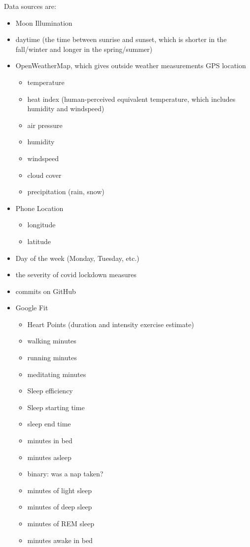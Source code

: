 \documentclass[conference]{IEEEtran}
\begin{document}
Data sources are:
\begin{itemize}
\item Moon Illumination
\item daytime (the time between sunrise and sunset, which is shorter in the fall/winter and longer in the spring/summer)
\item OpenWeatherMap, which gives outside weather measurements GPS location 
   \begin{itemize}
\item temperature
\item heat index (human-perceived equivalent temperature, which includes humidity and windspeed)
\item air pressure
\item humidity
\item windspeed
\item cloud cover
\item precipitation (rain, snow)
\end{itemize}
\item Phone Location
   \begin{itemize}
\item longitude
\item latitude
\end{itemize}
\item Day of the week (Monday, Tuesday, etc.)
\item the severity of covid lockdown measures
\item commits on GitHub
\item Google Fit
   \begin{itemize}
\item Heart Points (duration and intensity exercise estimate)
\item walking minutes
\item running minutes
\item meditating minutes
\item Sleep efficiency
\item Sleep starting time
\item sleep end time
\item minutes in bed
\item minutes asleep
\item binary: was a nap taken?
\item minutes of light sleep
\item minutes of deep sleep
\item minutes of REM sleep
\item minutes awake in bed

\end{itemize}
\end{itemize}
\end{document}
